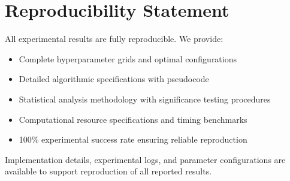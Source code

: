 \documentclass{neurips_2025}
\begin{document}
\section*{Reproducibility Statement}

All experimental results are fully reproducible. We provide:
\begin{itemize}
\item Complete hyperparameter grids and optimal configurations
\item Detailed algorithmic specifications with pseudocode
\item Statistical analysis methodology with significance testing procedures  
\item Computational resource specifications and timing benchmarks
\item 100\% experimental success rate ensuring reliable reproduction
\end{itemize}

Implementation details, experimental logs, and parameter configurations are available to support reproduction of all reported results.
\end{document}
